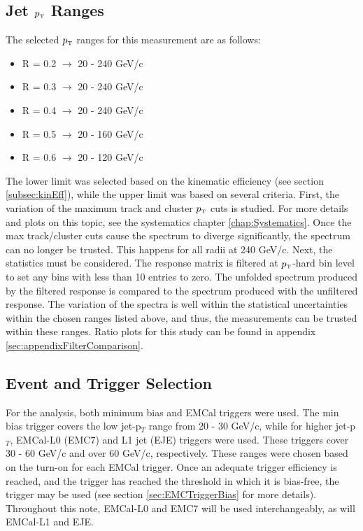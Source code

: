 \documentclass[ALICE]{ALICE_analysis_notes}
\newcommand{\pT}{$p_{\mbox{\tiny T}}$\xspace}
\begin{document}
\subsection{Jet \pT Ranges}
\label{sec:ptRanges}

The selected \pT ranges for this measurement are as follows:

\begin{itemize}
    \item R = 0.2 $\rightarrow$ 20 - 240 GeV/c
    \item R = 0.3 $\rightarrow$ 20 - 240 GeV/c
    \item R = 0.4 $\rightarrow$ 20 - 240 GeV/c
    \item R = 0.5 $\rightarrow$ 20 - 160 GeV/c
    \item R = 0.6 $\rightarrow$ 20 - 120 GeV/c
\end{itemize}

The lower limit was selected based on the kinematic efficiency (see section \ref{subsec:kinEff}), while the upper limit was based on several criteria. First, the variation of the maximum track and cluster \pT cuts is studied. For more details and plots on this topic, see the systematics chapter \ref{chap:Systematics}. Once the max track/cluster cuts cause the spectrum to diverge significantly, the spectrum can no longer be trusted. This happens for all radii at 240 GeV/c. Next, the statistics must be considered. The response matrix is filtered at \pT-hard bin level to set any bins with less than 10 entries to zero. The unfolded spectrum produced by the filtered response is compared to the spectrum produced with the unfiltered response. The variation of the spectra is well within the statistical uncertainties within the chosen ranges listed above, and thus, the measurements can be trusted within these ranges. Ratio plots for this study can be found in appendix \ref{sec:appendixFilterComparison}.

\subsection{Event and Trigger Selection}
\label{sec:EvtTrgSel}

For the analysis, both minimum bias and EMCal triggers were used. The min bias trigger covers the low jet-p$_T$ range from 20 - 30 GeV/c, while for higher jet-p$_T$, EMCal-L0 (EMC7) and L1 jet (EJE) triggers were used. These triggers cover 30 - 60 GeV/c and over 60 GeV/c, respectively. These ranges were chosen based on the turn-on for each EMCal trigger. Once an adequate trigger efficiency is reached, and the trigger has reached the threshold in which it is bias-free, the trigger may be used (see section \ref{sec:EMCTriggerBias} for more details). Throughout this note, EMCal-L0 and EMC7 will be used interchangeably, as will EMCal-L1 and EJE.
\end{document}
